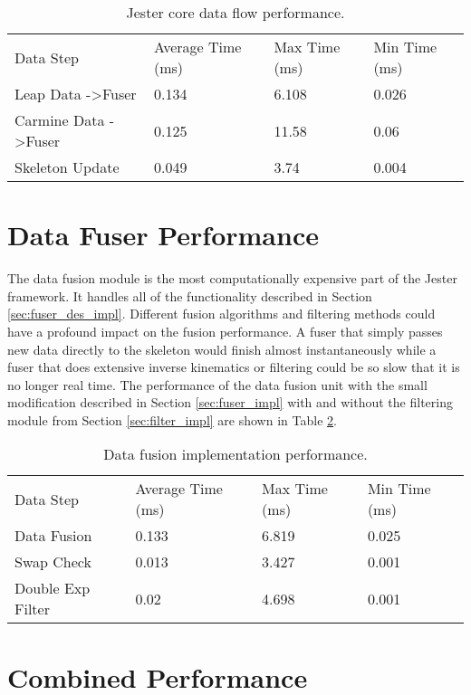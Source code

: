 \begin{table}[h]
\begin{tabular}{llll}
Data Step                        & Average Time (ms) & Max Time (ms) & Min Time (ms) \\
Leap Data -\textgreater Fuser    & 0.134             & 6.108         & 0.026             \\
Carmine Data -\textgreater Fuser & 0.125             & 11.58         & 0.06              \\
Skeleton Update                  & 0.049             & 3.74          & 0.004
\end{tabular}
\caption{Jester core data flow performance.}
\label{tab:core}
\end{table}

\section{Data Fuser Performance}

The data fusion module is the most computationally expensive part of the Jester framework. It handles all of the functionality described in Section \ref{sec:fuser_des_impl}. Different fusion algorithms and filtering methods could have a profound impact on the fusion performance. A fuser that simply passes new data directly to the skeleton would finish almost instantaneously while a fuser that does extensive inverse kinematics or filtering could be so slow that it is no longer real time. The performance of the data fusion unit with the small modification described in Section \ref{sec:fuser_impl} with and without the filtering module from Section \ref{sec:filter_impl} are shown in Table \ref{tab:fuser}.

\begin{table}[h]
\begin{tabular}{llll}
Data Step         & Average Time (ms) & Max Time (ms) & Min Time (ms) \\
Data Fusion       & 0.133             & 6.819         & 0.025         \\
Swap Check        & 0.013             & 3.427         & 0.001         \\
Double Exp Filter & 0.02              & 4.698         & 0.001        
\end{tabular}
\caption{Data fusion implementation performance.}
\label{tab:fuser}
\end{table}

\section{Combined Performance}

